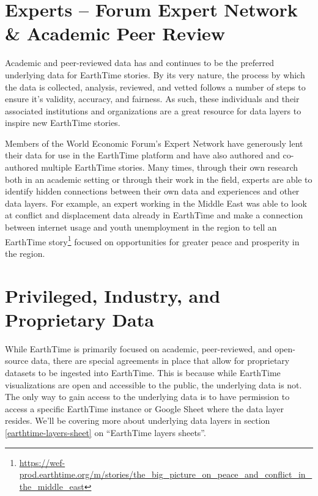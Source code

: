 \documentclass[
]{book}
\renewcommand{\href}[2]{#2\footnote{\url{#1}}}
\begin{document}
\hypertarget{experts-forum-expert-network-academic-peer-review}{%
\section{Experts -- Forum Expert Network \& Academic Peer Review}\label{experts-forum-expert-network-academic-peer-review}}

Academic and peer-reviewed data has and continues to be the preferred underlying data for EarthTime stories. By its very nature, the process by which the data is collected, analysis, reviewed, and vetted follows a number of steps to ensure it's validity, accuracy, and fairness. As such, these individuals and their associated institutions and organizations are a great resource for data layers to inspire new EarthTime stories.

Members of the World Economic Forum's Expert Network have generously lent their data for use in the EarthTime platform and have also authored and co-authored multiple EarthTime stories. Many times, through their own research both in an academic setting or through their work in the field, experts are able to identify hidden connections between their own data and experiences and other data layers. For example, an expert working in the Middle East was able to look at conflict and displacement data already in EarthTime and make a connection between internet usage and youth unemployment in the region to tell an \href{https://wef-prod.earthtime.org/m/stories/the_big_picture_on_peace_and_conflict_in_the_middle_east}{EarthTime story} focused on opportunities for greater peace and prosperity in the region.

\hypertarget{privileged-industry-and-proprietary-data}{%
\section{Privileged, Industry, and Proprietary Data}\label{privileged-industry-and-proprietary-data}}

While EarthTime is primarily focused on academic, peer-reviewed, and open-source data, there are special agreements in place that allow for proprietary datasets to be ingested into EarthTime. This is because while EarthTime visualizations are open and accessible to the public, the underlying data is not. The only way to gain access to the underlying data is to have permission to access a specific EarthTime instance or Google Sheet where the data layer resides. We'll be covering more about underlying data layers in section \ref{earthtime-layers-sheet} on ``EarthTime layers sheets''.
\end{document}
